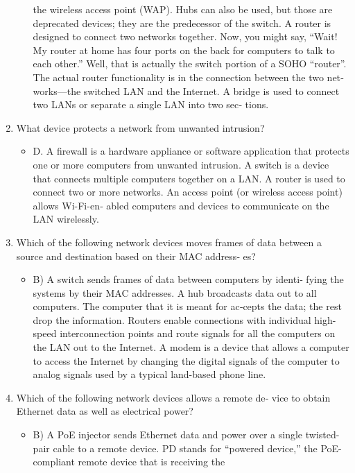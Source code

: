 \documentclass{article}
\begin{document}
\begin{enumerate}
\begin{itemize}
the wireless access point (WAP). Hubs can also be used, but
those are deprecated devices; they are the predecessor of the
switch. A router is designed to connect two networks together.
Now, you might say, “Wait! My router at home has four ports
on the back for computers to talk to each other.” Well, that is
actually the switch portion of a SOHO “router”. The actual
router functionality is in the connection between the two net‐
works—the switched LAN and the Internet. A bridge is used
to connect two LANs or separate a single LAN into two sec‐
tions.
    \end{itemize}
    \item What device protects a network from unwanted intrusion?
    \begin{itemize}
        \item D. A firewall is a hardware appliance or software application
that protects one or more computers from unwanted intrusion.
A switch is a device that connects multiple computers together
on a LAN. A router is used to connect two or more networks.
An access point (or wireless access point) allows Wi-Fi-en‐
abled computers and devices to communicate on the LAN
wirelessly.
    \end{itemize}
    \item Which of the following network devices moves frames of data
between a source and destination based on their MAC address‐
es?
    \begin{itemize}
        \item B) A switch sends frames of data between computers by identi‐
fying the systems by their MAC addresses. A hub broadcasts
data out to all computers. The computer that it is meant for ac‐cepts the data; the rest drop the information. Routers enable
connections with individual high-speed interconnection points
and route signals for all the computers on the LAN out to the
Internet. A modem is a device that allows a computer to access
the Internet by changing the digital signals of the computer to
analog signals used by a typical land-based phone line.
    \end{itemize}
    \item Which of the following network devices allows a remote de‐
vice to obtain Ethernet data as well as electrical power?
    \begin{itemize}
        \item B) A PoE injector sends Ethernet data and power over a single
twisted-pair cable to a remote device. PD stands for “powered
device,” the PoE-compliant remote device that is receiving the

\end{itemize}
\end{enumerate}
\end{document}
